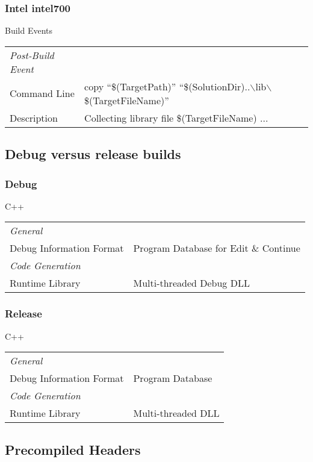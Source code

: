 \documentclass[10pt,a4paper,titlepage,dutch]{report}
\begin{document}
\subsubsection*{Intel intel700}
Build Events
\begin{tabular}{|l|l|}
  \hline
  \emph{Post-Build Event} & \\
  Command Line & copy ``\$(TargetPath)'' ``\$(SolutionDir)..$\backslash$lib$\backslash$\$(TargetFileName)''\\
  Description & Collecting library file \$(TargetFileName) ... \\
  \hline
\end{tabular}



\subsection{Debug versus release builds}

\subsubsection*{Debug}

C++

\begin{tabular}{|l|l|}
  \hline
  \emph{General} & \\
  Debug Information Format & Program Database for Edit \&
  Continue\\
  \hline
  \emph{Code Generation} & \\
  Runtime Library & Multi-threaded Debug DLL\\
  \hline
\end{tabular}

\subsubsection*{Release}

C++

\begin{tabular}{|l|l|}
  \hline
  \emph{General} & \\
  Debug Information Format & Program Database\\
  \hline
  \emph{Code Generation} & \\
  Runtime Library & Multi-threaded DLL\\
  \hline
\end{tabular}

\subsection {Precompiled Headers}
\end{document}
